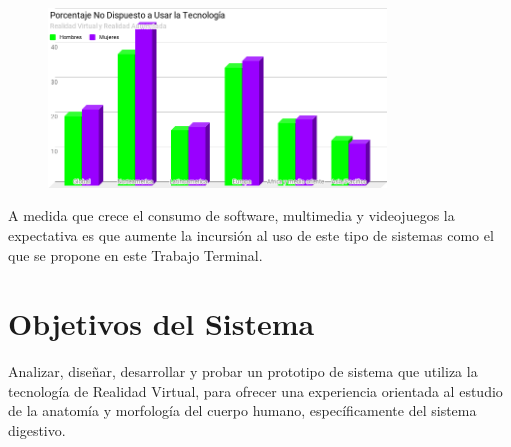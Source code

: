 \begin{figure}[H]
	\begin{center}
 		\includegraphics[width = 0.8\textwidth]{v3/images/chart1.png}
	\end{center} 
\end{figure}
A medida que crece el consumo de software, multimedia y videojuegos la expectativa es que aumente la incursión al uso de este tipo  de sistemas como el que se propone en este Trabajo Terminal.



\section{Objetivos del Sistema}
Analizar, diseñar, desarrollar y probar un prototipo de sistema que utiliza la tecnología de Realidad Virtual, para ofrecer una experiencia orientada al estudio 
de la anatomía y morfología del cuerpo humano, específicamente del sistema digestivo.\\
